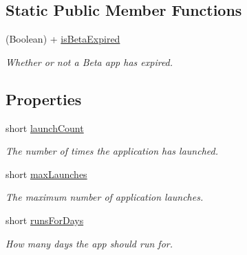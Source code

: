 \subsection*{Static Public Member Functions}
\begin{DoxyCompactItemize}
\item 
\hypertarget{interface_g_d_app_expiration_a61eb4d1818fa8870854b295b3e55c5e4}{
(Boolean) + \hyperlink{interface_g_d_app_expiration_a61eb4d1818fa8870854b295b3e55c5e4}{isBetaExpired}}
\label{interface_g_d_app_expiration_a61eb4d1818fa8870854b295b3e55c5e4}

\begin{DoxyCompactList}\small\item\em Whether or not a Beta app has expired. \item\end{DoxyCompactList}\end{DoxyCompactItemize}
\subsection*{Properties}
\begin{DoxyCompactItemize}
\item 
\hypertarget{interface_g_d_app_expiration_a9bc9471e0873ff739bb72dc712191d84}{
short \hyperlink{interface_g_d_app_expiration_a9bc9471e0873ff739bb72dc712191d84}{launchCount}}
\label{interface_g_d_app_expiration_a9bc9471e0873ff739bb72dc712191d84}

\begin{DoxyCompactList}\small\item\em The number of times the application has launched. \item\end{DoxyCompactList}\item 
\hypertarget{interface_g_d_app_expiration_af296a6893a09fe93c13e98081b79b122}{
short \hyperlink{interface_g_d_app_expiration_af296a6893a09fe93c13e98081b79b122}{maxLaunches}}
\label{interface_g_d_app_expiration_af296a6893a09fe93c13e98081b79b122}

\begin{DoxyCompactList}\small\item\em The maximum number of application launches. \item\end{DoxyCompactList}\item 
\hypertarget{interface_g_d_app_expiration_a59855dcd3ed7c19529284358771eea78}{
short \hyperlink{interface_g_d_app_expiration_a59855dcd3ed7c19529284358771eea78}{runsForDays}}
\label{interface_g_d_app_expiration_a59855dcd3ed7c19529284358771eea78}

\begin{DoxyCompactList}\small\item\em How many days the app should run for. \item\end{DoxyCompactList}\end{DoxyCompactItemize}


